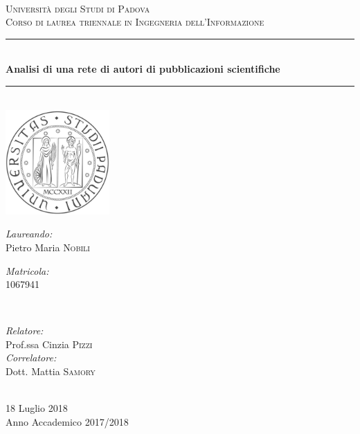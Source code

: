 \documentclass[12pt,a4paper,twoside]{report}
\begin{document}
\begin{titlepage}



\center  %

\textsc{\Large \\[4.5cm]Università degli Studi di Padova}\\[1.5cm]
\textsc{\Large Corso di laurea triennale in Ingegneria dell'Informazione}\\[0.5cm]

\noindent\rule{\textwidth}{0.6pt}\\[0.4cm]
{ \Large{\bfseries Analisi di una rete di autori di pubblicazioni scientifiche}}\\[0.4cm]
\noindent\rule{\textwidth}{0.6pt}\\[1cm]

\includegraphics[height=4cm]{img/unipd-bn}\\[1cm]


\begin{minipage}{0.4\textwidth}
\begin{flushleft} \large
\emph{Laureando:}\\
Pietro Maria \textsc{Nobili} %
\end{flushleft}
\begin{flushleft} \large
\emph{Matricola:}\\
1067941 %
\end{flushleft}
\end{minipage}
~
\begin{minipage}{0.5\textwidth}
\begin{flushright} \large
\emph{Relatore:} \\
Prof.ssa Cinzia \textsc{Pizzi} \\%
\emph{Correlatore:} \\
Dott. Mattia \textsc{Samory} %
\end{flushright}
\end{minipage}\\[2cm]


{\large 18 Luglio 2018}\\
{\large Anno Accademico 2017/2018}\\[3cm] %


\vfill %

\end{titlepage}
\end{document}
